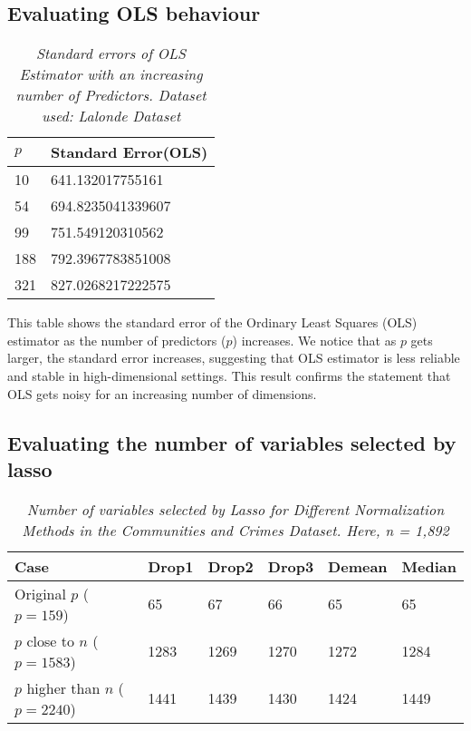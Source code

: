 \subsection{Evaluating OLS behaviour}
\begin{table}[h!]
\renewcommand{\arraystretch}{1.5}
\centering
\begin{tabular}{||l l||} 
 \hline
 \hline
 $p$ & Standard Error(OLS) \\ [0.5ex] 
 \hline\hline
 10 & 641.132017755161 \\ 
 54 & 694.8235041339607  \\
 99 & 751.549120310562 \\ 
 188 & 792.3967783851008 \\ 
 321 & 827.0268217222575 \\[1ex] 
 \hline
\end{tabular}
\caption{\textit{Standard errors of OLS Estimator with an increasing number of Predictors. Dataset used: Lalonde Dataset}}
\label{table:1}
\end{table}
This table shows the standard error of the Ordinary Least Squares (OLS) estimator as the number of predictors ($p$) increases. We notice that as $p$ gets larger, the standard error increases, suggesting that OLS estimator is less reliable and stable in high-dimensional settings. This result confirms the statement that OLS gets noisy for an increasing number of dimensions. 

\subsection{Evaluating the number of variables selected by lasso}

\begin{table}[h!]
\renewcommand{\arraystretch}{1.5}
\centering
\begin{tabular}{||l l l l l l||} 
 \hline
 \hline
 Case & Drop1 & Drop2 & Drop3 & Demean & Median \\ [0.5ex] 
 \hline\hline 
 Original $p$ ($p = 159$) & 65 & 67 & 66 & 65 & 65 \\ 
 $p$ close to $n$ ($p = 1583$) & 1283 & 1269 & 1270 & 1272 & 1284 \\
 $p$ higher than $n$ ($p= 2240$) & 1441 & 1439 & 1430 & 1424 & 1449 \\ [1ex] 
 \hline
\end{tabular}
\caption{\textit{Number of variables selected by Lasso for Different Normalization Methods in the Communities and Crimes Dataset. Here, n = 1,892 }}
\label{table:1}
\end{table}

